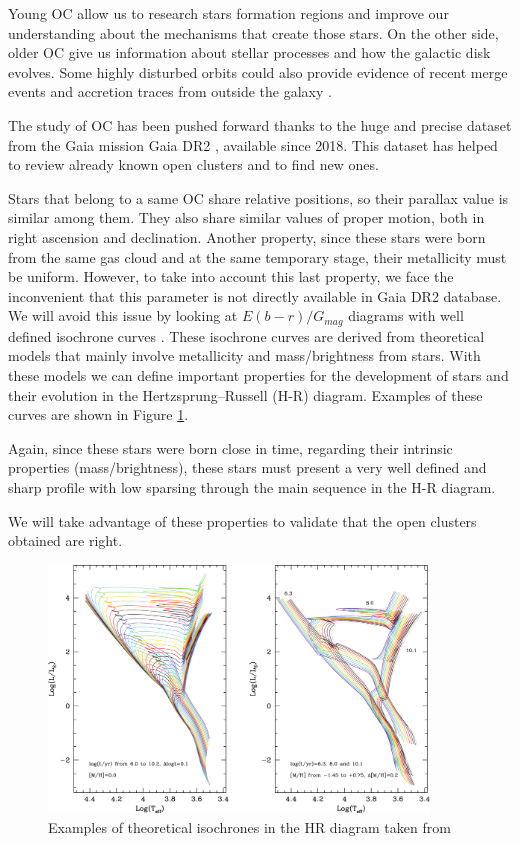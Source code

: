 \documentclass[11pt, a4paper, english]{book}
\begin{document}
Young OC allow us to research stars formation regions and improve our understanding about the mechanisms that create those stars.
On the other side, older OC give us information about stellar processes and how the galactic disk evolves.
Some highly disturbed orbits could also provide evidence of recent merge events and accretion traces from outside the galaxy
\cite{cantat2016abundances}.

The study of OC has been pushed forward thanks to the huge and precise dataset from the Gaia mission
\cite{collaboration2016description} Gaia DR2 \cite{gaia2018gaia}, available since 2018.
This dataset has helped to review already known open clusters and to find new ones.

Stars that belong to a same OC share relative positions, so their parallax value is similar among them. They also share similar values of
proper motion, both in right ascension and declination. Another property, since these stars were born from the same gas cloud and at the same
temporary stage, their metallicity must be uniform. However, to take into account this last property, we face the inconvenient that this
parameter is not directly available in Gaia DR2 database. We will avoid this issue by looking at $E(b-r) / G_{mag}$ diagrams with well
defined isochrone curves \cite{bressan2012parsec}. These isochrone curves are derived from theoretical models that mainly involve metallicity
and mass/brightness from stars. With these models we can define important properties for the development of stars and their evolution in the
Hertzsprung–Russell (H-R) diagram. Examples of these curves are shown in Figure \ref{fig:examples_of_isochrones}.

Again, since these stars were born close in time, regarding their intrinsic properties (mass/brightness), these stars must present a very
well defined and sharp profile with low sparsing through the main sequence in the H-R diagram.

We will take advantage of these properties to validate that the open clusters obtained are right.

\begin{figure}[htbp]
  \centering
  \includegraphics[width=0.9\textwidth]{../figures/theoretical_isochrones_in_hr_diagrams.pdf}
  \caption{Examples of theoretical isochrones in the HR diagram taken from \protect{}}
  \label{fig:examples_of_isochrones}
\end{figure}
\end{document}
